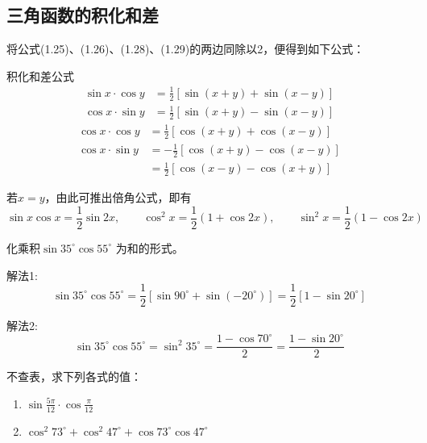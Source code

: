 \subsection{三角函数的积化和差}
将公式(1.25)、(1.26)、(1.28)、(1.29)的两边同除以2，便得到如下公式：

\begin{blk}{积化和差公式}
\begin{align*}
\sin x\cdot\cos y  &= \frac{1}{2} [\sin (x+y) +\sin (x-y)] \tag{V}\\
\cos x\cdot \sin y &=\frac{1}{2}  [\sin (x+y)-\sin (x-y)] \tag{VI} 
\end{align*} 
\begin{align*}
\cos x\cdot\cos y  &= \frac{1}{2} [\cos (x+y) +\cos (x-y)] \tag{VII}\\
\cos x\cdot \sin y &=-\frac{1}{2}  [\cos (x+y)-\cos (x-y)]  \\
&=\frac{1}{2}[\cos (x-y)-\cos (x+y)] \tag{VIII}
\end{align*} 
\end{blk}

若$x=y$，由此可推出倍角公式，即有
\[\sin x\cos x=\frac{1}{2}\sin 2x,\qquad \cos^2 x=\frac{1}{2}(1+\cos 2x),\qquad \sin^2x=\frac{1}{2}(1-\cos2x)\]

\begin{example}
    化乘积$\sin35^{\circ} \cos55^{\circ}$ 为和的形式。
\end{example}

\begin{solution}
解法1: 
\[\sin35^{\circ} \cos55^{\circ} =\frac{1}{2}[\sin90^{\circ} +\sin (-20^{\circ} ) ]
=\frac{1}{2} [1-\sin20^{\circ} ]\]

解法2:
\[\sin35^{\circ} \cos55^{\circ}=\sin^2 35^{\circ} =\frac{1-\cos 70^{\circ}}{2}=\frac{1-\sin 20^{\circ}}{2}\]
\end{solution}


\begin{example}
    不查表，求下列各式的值：
\begin{enumerate}
    \item $\sin\frac{5\pi}{12}\cdot\cos\frac{\pi}{12}$
    \item $\cos^2 73^{\circ} +\cos^2 47^{\circ} +\cos73^{\circ} \cos47^{\circ}$
\end{enumerate}
\end{example}

